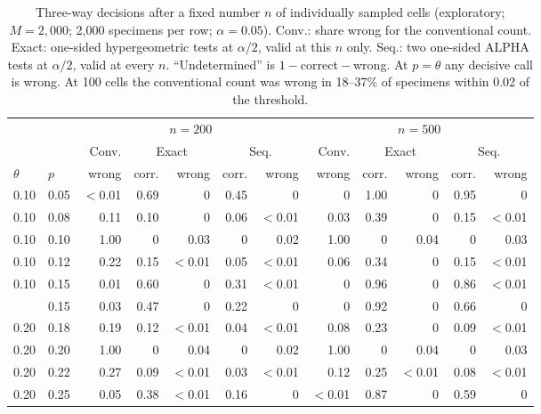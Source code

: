 \documentclass[11pt]{article}
\theoremstyle{remark}
\theoremstyle{definition}
\begin{document}
\begin{table}[t]
\centering\small
\caption{Three-way decisions after a fixed number $n$ of individually sampled cells (exploratory; $M=2{,}000$; 2,000 specimens per row; $\alpha=0.05$). Conv.: share wrong for the conventional count. Exact: one-sided hypergeometric tests at $\alpha/2$, valid at this $n$ only. Seq.: two one-sided ALPHA tests at $\alpha/2$, valid at every $n$. ``Undetermined'' is $1-{}$correct${}-{}$wrong. At $p=\theta$ any decisive call is wrong. At 100 cells the conventional count was wrong in 18--37\% of specimens within 0.02 of the threshold.}\label{tab:decision}
\begin{tabular}{@{}ll r rr rr r rr rr@{}}
\toprule
 & & \multicolumn{5}{c}{$n=200$} & \multicolumn{5}{c}{$n=500$}\\
\cmidrule(lr){3-7}\cmidrule(l){8-12}
 & & Conv. & \multicolumn{2}{c}{Exact} & \multicolumn{2}{c}{Seq.} & Conv. & \multicolumn{2}{c}{Exact} & \multicolumn{2}{c}{Seq.}\\
$\theta$ & $p$ & wrong & corr. & wrong & corr. & wrong & wrong & corr. & wrong & corr. & wrong\\
\midrule
0.10 & 0.05 & $<$0.01 & 0.69 & 0 & 0.45 & 0 & 0 & 1.00 & 0 & 0.95 & 0\\
0.10 & 0.08 & 0.11 & 0.10 & 0 & 0.06 & $<$0.01 & 0.03 & 0.39 & 0 & 0.15 & $<$0.01\\
0.10 & 0.10 & 1.00 & 0 & 0.03 & 0 & 0.02 & 1.00 & 0 & 0.04 & 0 & 0.03\\
0.10 & 0.12 & 0.22 & 0.15 & $<$0.01 & 0.05 & $<$0.01 & 0.06 & 0.34 & 0 & 0.15 & $<$0.01\\
0.10 & 0.15 & 0.01 & 0.60 & 0 & 0.31 & $<$0.01 & 0 & 0.96 & 0 & 0.86 & $<$0.01\\
\addlinespace
0.20 & 0.15 & 0.03 & 0.47 & 0 & 0.22 & 0 & 0 & 0.92 & 0 & 0.66 & 0\\
0.20 & 0.18 & 0.19 & 0.12 & $<$0.01 & 0.04 & $<$0.01 & 0.08 & 0.23 & 0 & 0.09 & $<$0.01\\
0.20 & 0.20 & 1.00 & 0 & 0.04 & 0 & 0.02 & 1.00 & 0 & 0.04 & 0 & 0.03\\
0.20 & 0.22 & 0.27 & 0.09 & $<$0.01 & 0.03 & $<$0.01 & 0.12 & 0.25 & $<$0.01 & 0.08 & $<$0.01\\
0.20 & 0.25 & 0.05 & 0.38 & $<$0.01 & 0.16 & 0 & $<$0.01 & 0.87 & 0 & 0.59 & 0\\
\bottomrule
\end{tabular}
\end{table}
\end{document}
